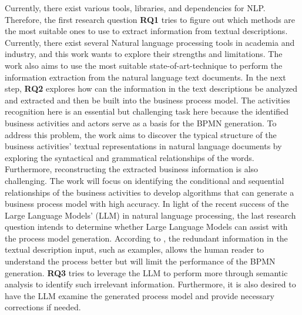 	
	Currently, there exist various tools, libraries, and dependencies for NLP. Therefore, the first research question \textbf{RQ1} tries to figure out which methods are the most suitable ones to use to extract information from textual descriptions. Currently, there exist several Natural language processing tools in academia and industry, and this work wants to explore their strengths and limitations. The work also aims to use the most suitable state-of-art-technique to perform the information extraction from the natural language text documents. 
	In the next step, \textbf{RQ2} explores how can the information in the text descriptions be analyzed and extracted and then be built into the business process model. The activities recognition here is an essential but challenging task here because the identified business activities and actors serve as a basis for the BPMN generation. To address this problem, the work aims to discover the typical structure of the business activities' textual representations in natural language documents by exploring the syntactical and grammatical relationships of the words. Furthermore, reconstructing the extracted business information is also challenging. The work will focus on identifying the conditional and sequential relationships of the business activities to develop algorithms that can generate a business process model with high accuracy.
	In light of the recent success of the Large Language Models' (LLM) in natural language processing, the last research question intends to determine whether Large Language Models can assist with the process model generation. According to \cite{t2m_1}, the redundant information in the textual description input, such as examples, allows the human reader to understand the process better but will limit the performance of the BPMN generation. \textbf{RQ3} tries to leverage the LLM to perform more through semantic analysis to identify such irrelevant information. Furthermore, it is also desired to have the LLM examine the generated process model and provide necessary corrections if needed.


